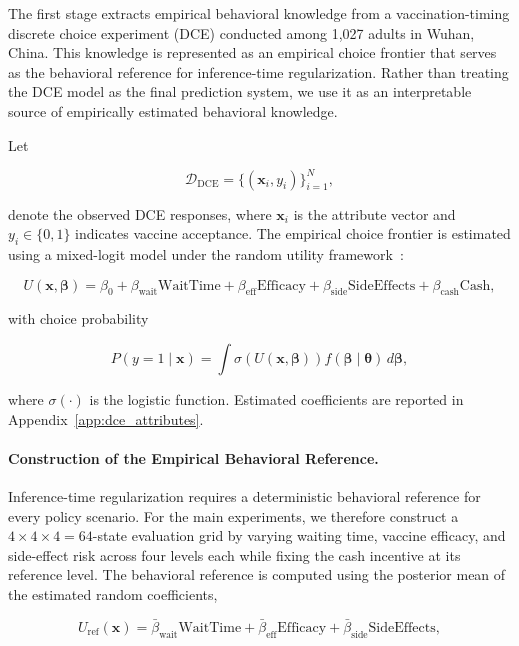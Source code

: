 \documentclass[11pt]{article}
\begin{document}
The first stage extracts empirical behavioral knowledge from a vaccination-timing discrete choice experiment (DCE) conducted among 1,027 adults in Wuhan, China. This knowledge is represented as an empirical choice frontier that serves as the behavioral reference for inference-time regularization. Rather than treating the DCE model as the final prediction system, we use it as an interpretable source of empirically estimated behavioral knowledge.

Let

\[
\mathcal{D}_{\mathrm{DCE}}
=
\{(\mathbf{x}_i,y_i)\}_{i=1}^{N},
\]

denote the observed DCE responses, where $\mathbf{x}_i$ is the attribute vector and $y_i\in\{0,1\}$ indicates vaccine acceptance. The empirical choice frontier is estimated using a mixed-logit model under the random utility framework~\citep{McFadden1974b,BenAkiva1985}:

\[
U(\mathbf{x},\boldsymbol{\beta})
=
\beta_0
+
\beta_{\mathrm{wait}}\mathrm{WaitTime}
+
\beta_{\mathrm{eff}}\mathrm{Efficacy}
+
\beta_{\mathrm{side}}\mathrm{SideEffects}
+
\beta_{\mathrm{cash}}\mathrm{Cash},
\]

with choice probability

\[
P(y=1\mid\mathbf{x})
=
\int
\sigma\!\left(U(\mathbf{x},\boldsymbol{\beta})\right)
f(\boldsymbol{\beta}\mid\boldsymbol{\theta})
\,d\boldsymbol{\beta},
\]

where $\sigma(\cdot)$ is the logistic function. Estimated coefficients are reported in Appendix~\ref{app:dce_attributes}.

\paragraph{Construction of the Empirical Behavioral Reference.}

Inference-time regularization requires a deterministic behavioral reference for every policy scenario. For the main experiments, we therefore construct a $4\times4\times4=64$-state evaluation grid by varying waiting time, vaccine efficacy, and side-effect risk across four levels each while fixing the cash incentive at its reference level. The behavioral reference is computed using the posterior mean of the estimated random coefficients,

\[
U_{\mathrm{ref}}(\mathbf{x})
=
\bar{\beta}_{\mathrm{wait}}\mathrm{WaitTime}
+
\bar{\beta}_{\mathrm{eff}}\mathrm{Efficacy}
+
\bar{\beta}_{\mathrm{side}}\mathrm{SideEffects},
\]
\end{document}
